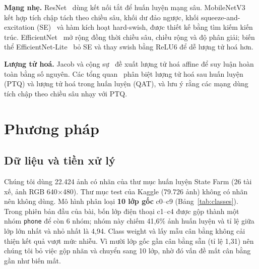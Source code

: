 \documentclass[10pt,a4paper,twocolumn]{article}
\newcommand{\cls}[1]{\texttt{#1}}
\begin{document}
\textbf{Mạng nhẹ.} ResNet~\cite{he2016resnet} dùng kết nối tắt để huấn luyện mạng sâu. MobileNetV3~\cite{howard2019mobilenetv3} kết hợp tích chập tách theo chiều sâu, khối dư đảo ngược, khối squeeze-and-excitation (SE)~\cite{hu2018senet} và hàm kích hoạt hard-swish, được thiết kế bằng tìm kiếm kiến trúc. EfficientNet~\cite{tan2019efficientnet} mở rộng đồng thời chiều sâu, chiều rộng và độ phân giải; biến thể EfficientNet-Lite~\cite{efficientnetlite} bỏ SE và thay swish bằng ReLU6 để dễ lượng tử hoá hơn.

\textbf{Lượng tử hoá.} Jacob và cộng sự~\cite{jacob2018quant} đề xuất lượng tử hoá affine để suy luận hoàn toàn bằng số nguyên. Các tổng quan~\cite{krishnamoorthi2018,nagel2021white} phân biệt lượng tử hoá sau huấn luyện (PTQ) và lượng tử hoá trong huấn luyện (QAT), và lưu ý rằng các mạng dùng tích chập theo chiều sâu nhạy với PTQ.

\section{Phương pháp}

\subsection{Dữ liệu và tiền xử lý}
Chúng tôi dùng 22.424 ảnh có nhãn của thư mục huấn luyện State Farm (26 tài xế, ảnh RGB 640$\times$480). Thư mục test của Kaggle (79.726 ảnh) không có nhãn nên không dùng. Mô hình phân loại \textbf{10 lớp gốc} c0--c9 (Bảng~\ref{tab:classes}). Trong phiên bản đầu của bài, bốn lớp điện thoại c1--c4 được gộp thành một nhóm \cls{phone} để còn 6 nhóm; nhóm này chiếm 41,6\% ảnh huấn luyện và tỉ lệ giữa lớp lớn nhất và nhỏ nhất là 4,94. Class weight và lấy mẫu cân bằng không cải thiện kết quả vượt mức nhiễu. Vì mười lớp gốc gần cân bằng sẵn (tỉ lệ 1,31) nên chúng tôi bỏ việc gộp nhãn và chuyển sang 10 lớp, nhờ đó vấn đề mất cân bằng gần như biến mất.
\end{document}
